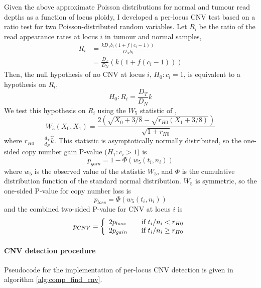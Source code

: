 \documentclass[dissertation.tex]{subfiles}
\begin{document}
Given the above approximate Poisson distributions for normal and tumour read depths as a function of locus ploidy, I developed a per-locus \gls{CNV} test based on a ratio test for two Poisson-distributed random variables.  Let $R_i$ be the ratio of the read appearance rates at locus $i$ in tumour and normal samples, 
\begin{align}
  R_i &= \frac{k D_T b_i \left( 1 + f \left(c_i - 1\right) \right)}{D_N b_i} \\
      &= \frac{D_T}{D_N} \left( k \left( 1 + f \left( c_i - 1 \right)\right) \right)
\end{align}
Then, the null hypothesis of no \gls{CNV} at locus $i$, $H_0: c_i = 1$, is equivalent to a hypothesis on $R_i$, 
\begin{equation}
H_0: R_i = \frac{D_T}{D_N}k
\end{equation}
We test this hypothesis on $R_i$ using the $W_5$ statistic of \cite{Gu2008},
\begin{equation}
  W_5(X_0, X_1) = \frac{2\left(\sqrt{X_0 + 3/8} - \sqrt{r_{H0}\left(X_1 + 3/8\right)}\right)}{\sqrt{1 + r_{H0}}}
\end{equation}
where $r_{H0} = \frac{d_T}{d_N}\hat{k}$.  This statistic is asymptotically normally distributed, so the one-sided copy number gain P-value ($H_1: c_i > 1$) is
\begin{equation}
  p_{gain} = 1 - \Phi\left(w_5(t_i, n_i)\right)
\end{equation}
where $w_5$ is the observed value of the statistic $W_5$, and $\Phi$ is the cumulative distribution function of the standard normal distribution.  $W_5$ is symmetric, so the one-sided P-value for copy number loss is
\begin{equation}
  p_{loss} = \Phi\left(w_5(t_i, n_i)\right)
\end{equation}
and the combined two-sided P-value for \gls{CNV} at locus $i$ is
\begin{equation}
  p_{CNV} = \left\{ 
    \begin{array}{l l}
      2 p_{loss} & \quad \text{if $t_i/n_i < r_{H0}$} \\
      2 p_{gain} & \quad \text{if $t_i/n_i \geq r_{H0}$}
    \end{array}
  \right.
\end{equation}

\paragraph{\Acrshort{CNV} detection procedure}
Pseudocode for the implementation of per-locus \gls{CNV} detection is given in algorithm \ref{alg:comp_find_cnv}.  
\end{document}
